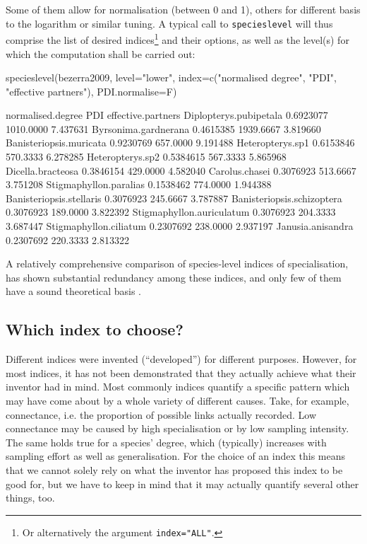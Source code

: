 \documentclass[a4paper, 11pt]{article}\usepackage[]{graphicx}\usepackage[]{color}
\begin{document}
\noindent Some of them allow for normalisation (between 0 and 1), others for different basis to the logarithm or similar tuning. A typical call to \texttt{specieslevel} will thus comprise the list of desired indices\footnote{Or alternatively the argument \texttt{index="ALL"}.} and their options, as well as the level(s) for which the computation shall be carried out:
\begin{Schunk}
\begin{Sinput}
specieslevel(bezerra2009, level="lower", index=c("normalised degree", "PDI", 
      "effective partners"), PDI.normalise=F)
\end{Sinput}
\begin{Soutput}
                           normalised.degree       PDI effective.partners
Diplopterys.pubipetala             0.6923077 1010.0000           7.437631
Byrsonima.gardnerana               0.4615385 1939.6667           3.819660
Banisteriopsis.muricata            0.9230769  657.0000           9.191488
Heteropterys.sp1                   0.6153846  570.3333           6.278285
Heteropterys.sp2                   0.5384615  567.3333           5.865968
Dicella.bracteosa                  0.3846154  429.0000           4.582040
Carolus.chasei                     0.3076923  513.6667           3.751208
Stigmaphyllon.paralias             0.1538462  774.0000           1.944388
Banisteriopsis.stellaris           0.3076923  245.6667           3.787887
Banisteriopsis.schizoptera         0.3076923  189.0000           3.822392
Stigmaphyllon.auriculatum          0.3076923  204.3333           3.687447
Stigmaphyllon.ciliatum             0.2307692  238.0000           2.937197
Janusia.anisandra                  0.2307692  220.3333           2.813322
\end{Soutput}
\end{Schunk}
A relatively comprehensive comparison of species-level indices of specialisation, \citet{Dormann2011} has shown substantial redundancy among these indices, and only few of them have a sound theoretical basis \citep{Poisot2012a}.



\subsection{Which index to choose?}%
Different indices were invented (``developed'') for different purposes. However, for most indices, it has not been demonstrated that they actually achieve what their inventor had in mind. Most commonly indices quantify a specific pattern which may have come about by a whole variety of different causes. Take, for example, connectance, i.e. the proportion of possible links actually recorded. Low connectance may be caused by high specialisation or by low sampling intensity. The same holds true for a species' degree, which (typically) increases with sampling effort as well as generalisation. For the choice of an index this means that we cannot solely rely on what the inventor has proposed this index to be good for, but we have to keep in mind that it may actually quantify several other things, too.
\end{document}
